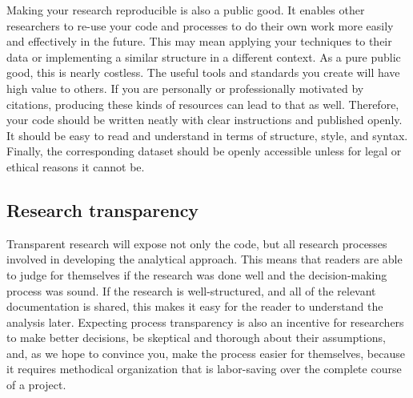 Making your research reproducible is also a public good.
It enables other researchers to re-use your code and processes
to do their own work more easily and effectively in the future.
This may mean applying your techniques to their data
or implementing a similar structure in a different context.
As a pure public good, this is nearly costless.
The useful tools and standards you create will have high value to others.
If you are personally or professionally motivated by citations,
producing these kinds of resources can lead to that as well.
Therefore, your code should be written neatly with clear instructions and published openly.
It should be easy to read and understand in terms of structure, style, and syntax.
Finally, the corresponding dataset should be openly accessible
unless for legal or ethical reasons it cannot be.

\subsection{Research transparency}

Transparent research will expose not only the code,
but all research processes involved in developing the analytical approach.
This means that readers are able to judge for themselves if the research was done well
and the decision-making process was sound.
If the research is well-structured, and all of the relevant documentation
is shared, this makes it easy for the reader to understand the analysis later.
Expecting process transparency is also an incentive for researchers to make better decisions,
be skeptical and thorough about their assumptions,
and, as we hope to convince you, make the process easier for themselves,
because it requires methodical organization that is labor-saving over the complete course of a project.


